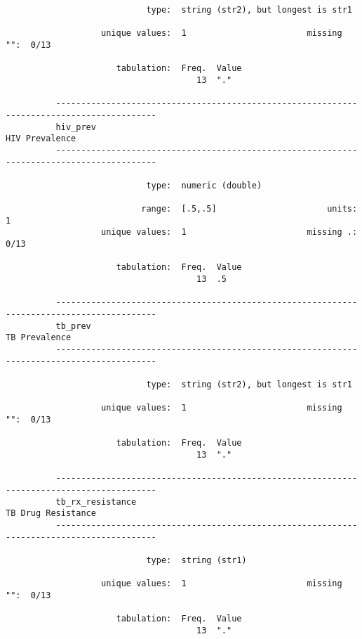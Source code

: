 \documentclass{article}
\begin{document}
\begin{verbatim}
                            type:  string (str2), but longest is str1
          
                   unique values:  1                        missing "":  0/13
          
                      tabulation:  Freq.  Value
                                      13  "."
          
          ------------------------------------------------------------------------------------------
          hiv_prev                                                                    HIV Prevalence
          ------------------------------------------------------------------------------------------
          
                            type:  numeric (double)
          
                           range:  [.5,.5]                      units:  1
                   unique values:  1                        missing .:  0/13
          
                      tabulation:  Freq.  Value
                                      13  .5
          
          ------------------------------------------------------------------------------------------
          tb_prev                                                                      TB Prevalence
          ------------------------------------------------------------------------------------------
          
                            type:  string (str2), but longest is str1
          
                   unique values:  1                        missing "":  0/13
          
                      tabulation:  Freq.  Value
                                      13  "."
          
          ------------------------------------------------------------------------------------------
          tb_rx_resistance                                                        TB Drug Resistance
          ------------------------------------------------------------------------------------------
          
                            type:  string (str1)
          
                   unique values:  1                        missing "":  0/13
          
                      tabulation:  Freq.  Value
                                      13  "."
          

\end{verbatim}
\end{document}
